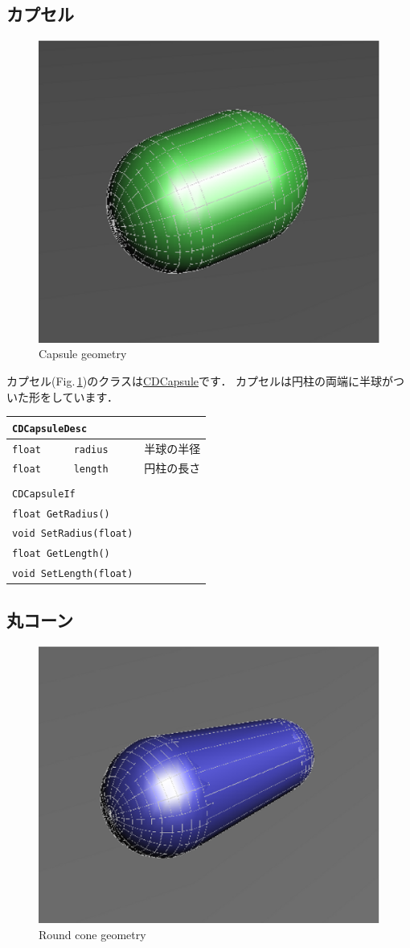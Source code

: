 \subsection*{カプセル}

\begin{figure}[t]
\begin{center}
\includegraphics[width=.4\hsize]{fig/cdcapsule.eps}
\end{center}
\caption{Capsule geometry}
\label{fig_cdcapsule}
\end{figure}

\KLUDGE カプセル(Fig.\,\ref{fig_cdcapsule})のクラスは\url{CDCapsule}です．
\KLUDGE カプセルは円柱の両端に半球がついた形をしています．

\begin{center}
\begin{tabular}{lll}
\multicolumn{3}{l}{\texttt{CDCapsuleDesc}}				\\ \midrule
\texttt{float}	&	\texttt{radius}	& 半球の半径 		\\
\texttt{float}	&	\texttt{length} & 円柱の長さ		\\
\\
\multicolumn{3}{l}{\texttt{CDCapsuleIf}}				\\ \midrule
\multicolumn{2}{l}{\texttt{float GetRadius()}}			\\
\multicolumn{2}{l}{\texttt{void SetRadius(float)}}		\\
\multicolumn{2}{l}{\texttt{float GetLength()}}			\\
\multicolumn{2}{l}{\texttt{void SetLength(float)}}		\\
\end{tabular}
\end{center}


\subsection*{丸コーン}

\begin{figure}[t]
\begin{center}
\includegraphics[width=.4\hsize]{fig/cdroundcone.eps}
\end{center}
\caption{Round cone geometry}
\label{fig_cdroundcone}
\end{figure}

